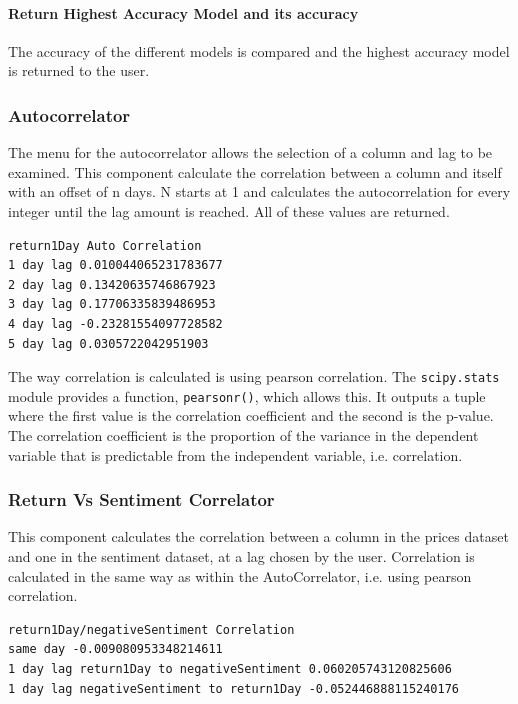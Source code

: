 \paragraph{Return Highest Accuracy Model and its accuracy}

The accuracy of the different models is compared and the highest accuracy model is returned to the user.

\subsubsection{Autocorrelator}

The menu for the autocorrelator allows the selection of a column and lag to be examined. This component calculate the correlation between a column and itself with an offset of n days. N starts at 1 and calculates the autocorrelation for every integer until the lag amount is reached. All of these values are returned.

\begin{lstlisting}[caption=Example AutoCorrelator Output when lag = 5 for return1Day column]
return1Day Auto Correlation
1 day lag 0.010044065231783677
2 day lag 0.13420635746867923
3 day lag 0.17706335839486953
4 day lag -0.23281554097728582
5 day lag 0.0305722042951903
\end{lstlisting}

The way correlation is calculated is using pearson correlation. The \verb|scipy.stats| module provides a function, \verb|pearsonr()|, which allows this. It outputs a tuple where the first value is the correlation coefficient and the second is the p-value. The correlation coefficient is the proportion of the variance in the dependent variable that is predictable from the independent variable, i.e. correlation.

\subsubsection{Return Vs Sentiment Correlator}

This component calculates the correlation between a column in the prices dataset and one in the sentiment dataset, at a lag chosen by the user. Correlation is calculated in the same way as within the AutoCorrelator, i.e. using pearson correlation.

\begin{lstlisting}[caption=Example Return Vs Sentiment Output]
return1Day/negativeSentiment Correlation
same day -0.009080953348214611
1 day lag return1Day to negativeSentiment 0.060205743120825606
1 day lag negativeSentiment to return1Day -0.052446888115240176
\end{lstlisting}

